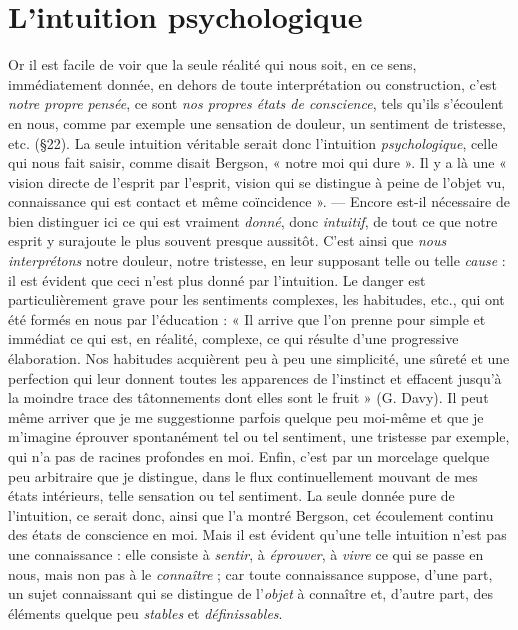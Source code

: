 \section{L'intuition psychologique}%
Or il est facile de voir que la
seule réalité qui nous soit, en ce sens, immédiatement donnée, en
dehors de toute interprétation ou construction, c’est {\it notre propre
pensée}, ce sont {\it nos propres états de conscience}, tels qu’ils s’écoulent en
nous, comme par exemple une sensation de douleur, un sentiment de
tristesse, etc. (\S 22). La seule intuition véritable serait donc l'intuition
{\it psychologique}, celle qui nous fait saisir, comme disait Bergson,
« notre moi qui dure ». Il y a là une « vision directe de l’esprit par
l'esprit, vision qui se distingue à peine de l’objet vu, connaissance qui
est contact et même coïncidence ». — Encore est-il nécessaire de bien
distinguer ici ce qui est vraiment {\it donné}, donc {\it intuitif}, de tout ce que
notre esprit y surajoute le plus souvent presque aussitôt. C’est ainsi
que {\it nous interprétons} notre douleur, notre tristesse, en leur supposant
telle ou telle {\it cause} : il est évident que ceci n’est plus donné par l’intuition.
Le danger est particulièrement grave pour les sentiments complexes,
les habitudes, etc., qui ont été formés en nous par l’éducation : « Il
arrive que l’on prenne pour simple et immédiat ce qui est, en réalité,
complexe, ce qui résulte d’une progressive élaboration. Nos habitudes
acquièrent peu à peu une simplicité, une sûreté et une perfection qui
leur donnent toutes les apparences de l’instinct et effacent jusqu’à la
moindre trace des tâtonnements dont elles sont le fruit » (G. Davy).
Il peut même arriver que je me suggestionne parfois quelque peu
moi-même et que je m’imagine éprouver spontanément tel ou tel sentiment,
une tristesse par exemple, qui n’a pas de racines profondes en
moi. Enfin, c’est par un morcelage quelque peu arbitraire que je distingue,
dans le flux continuellement mouvant de mes états intérieurs,
telle sensation ou tel sentiment. La seule donnée pure de l’intuition,
ce serait donc, ainsi que l’a montré Bergson, cet écoulement
continu des états de conscience en moi. Mais il est évident qu’une telle
intuition n’est pas une connaissance : elle consiste à {\it sentir}, à {\it éprouver},
à {\it vivre} ce qui se passe en nous, mais non pas à le {\it connaître} ; car
toute connaissance suppose, d’une part, un sujet connaissant qui se
distingue de l’{\it objet} à connaître et, d'autre part, des éléments quelque
peu {\it stables} et {\it définissables}.

